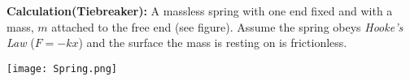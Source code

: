 \documentclass[11pt]{exam}
\begin{document}
\begin{questions}
\newpage
\addpoints
\question[5]\textbf{Calculation(Tiebreaker):} A massless spring with one end fixed and with a mass, $m$ attached to the free end (see figure). Assume the spring obeys \emph{Hooke's Law} ($F=-kx$) and the surface the mass is resting on is frictionless. 
\noaddpoints

\texttt{[image: Spring.png]}

\end{questions}
\end{document}
